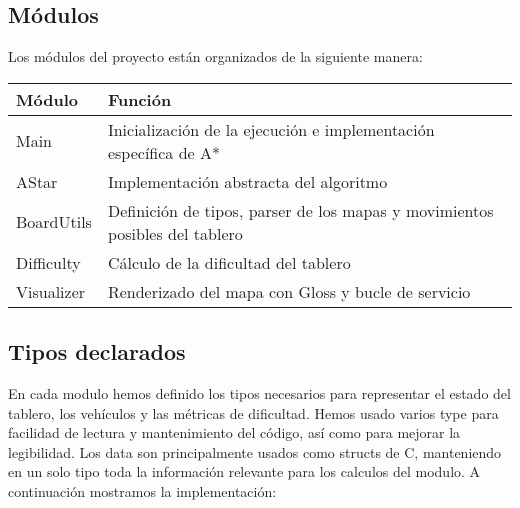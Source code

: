 \documentclass{article}
\begin{document}
\subsection*{Módulos}
Los módulos del proyecto están organizados de la siguiente manera:

\begin{table}[h!]
\centering
\begin{tabular}{|l|l|}
\hline
\textbf{Módulo} & \textbf{Función} \\
\hline
Main & Inicialización de la ejecución e implementación específica de A* \\
AStar & Implementación abstracta del algoritmo \\
BoardUtils & Definición de tipos, parser de los mapas y movimientos posibles del tablero \\
Difficulty & Cálculo de la dificultad del tablero \\
Visualizer & Renderizado del mapa con Gloss y bucle de servicio \\
\hline
\end{tabular}
\end{table}

\subsection*{Tipos declarados}

En cada modulo hemos definido los tipos necesarios para representar el estado del tablero, los vehículos y las métricas de dificultad.  Hemos usado varios type para facilidad de lectura y mantenimiento del código, así como para mejorar la legibilidad. Los data son principalmente usados como structs de C, manteniendo en un solo tipo toda la información relevante para los calculos del modulo. A continuación mostramos la implementación:
\end{document}
